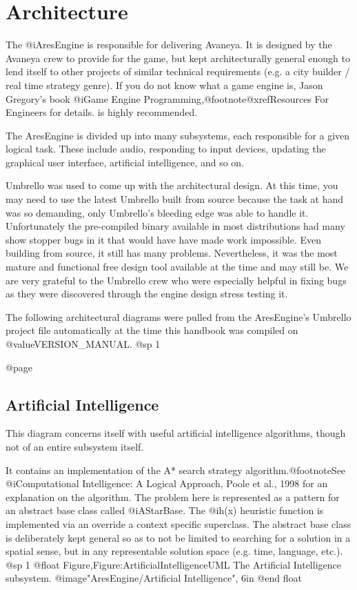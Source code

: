 \section{Architecture}

The @i{AresEngine} is responsible for delivering Avaneya. It is designed by the Avaneya crew to provide for the game, but kept architecturally general enough to lend itself to other projects of similar technical requirements (e.g. a city builder / real time strategy genre). If you do not know what a game engine is, Jason Gregory's book @i{Game Engine Programming},@footnote{@xref{Resources For Engineers} for details.} is highly recommended.

The AresEngine is divided up into many subsystems, each responsible for a given logical task. These include audio, responding to input devices, updating the graphical user interface, artificial intelligence, and so on.

Umbrello was used to come up with the architectural design. At this time, you may need to use the latest Umbrello built from source because the task at hand was so demanding, only Umbrello's bleeding edge was able to handle it. Unfortunately the pre-compiled binary available in most distributions had many show stopper bugs in it that would have have made work impossible. Even building from source, it still has many problems. Nevertheless, it was the most mature and functional free design tool available at the time and may still be. We are very grateful to the Umbrello crew who were especially helpful in fixing bugs as they were discovered through the engine design stress testing it.

The following architectural diagrams were pulled from the AresEngine's Umbrello project file automatically at the time this handbook was compiled on @value{VERSION_MANUAL}.
@sp 1

@page
\subsection{Artificial Intelligence}
This diagram concerns itself with useful artificial intelligence algorithms, though not of an entire subsystem itself.

It contains an implementation of the A* search strategy algorithm.@footnote{See @i{Computational Intelligence: A Logical Approach}, Poole et al., 1998 for an explanation on the algorithm.} The problem here is represented as a pattern for an abstract base class called @i{AStarBase}. The @i{h(x)} heuristic function is implemented via an override a context specific superclass. The abstract base class is deliberately kept general so as to not be limited to searching for a solution in a spatial sense, but in any representable solution space (e.g. time, language, etc.).
@sp 1
@float Figure,Figure:ArtificialIntelligenceUML
The Artificial Intelligence subsystem.
@image{"AresEngine/Artificial Intelligence", 6in}
@end float

